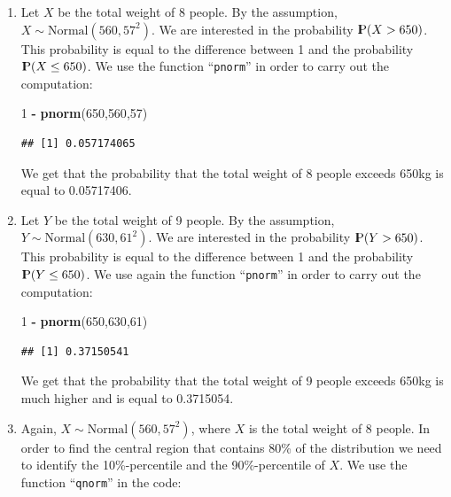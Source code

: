 \documentclass[]{krantz}
\makeatletter
\newenvironment{Shaded}{\begin{snugshade}}{\end{snugshade}}
\newcommand{\KeywordTok}[1]{\textcolor[rgb]{0.13,0.29,0.53}{\textbf{#1}}}
\newcommand{\DecValTok}[1]{\textcolor[rgb]{0.00,0.00,0.81}{#1}}
\newcommand{\StringTok}[1]{\textcolor[rgb]{0.31,0.60,0.02}{#1}}
\newcommand{\OperatorTok}[1]{\textcolor[rgb]{0.81,0.36,0.00}{\textbf{#1}}}
\newcommand{\NormalTok}[1]{#1}
\newcommand{\Prob}{{\rm I\kern-.3em P}}
\newenvironment{kframe}{%
\medskip{}
\setlength{\fboxsep}{.8em}
 \def\at@end@of@kframe{}%
 \ifinner\ifhmode%
  \def\at@end@of@kframe{\end{minipage}}%
  \begin{minipage}{\columnwidth}%
 \fi\fi%
 \def\FrameCommand##1{\hskip\@totalleftmargin \hskip-\fboxsep
 \colorbox{shadecolor}{##1}\hskip-\fboxsep
     \hskip-\linewidth \hskip-\@totalleftmargin \hskip\columnwidth}%
 \MakeFramed {\advance\hsize-\width
   \@totalleftmargin\z@ \linewidth\hsize
   \@setminipage}}%
 {\par\unskip\endMakeFramed%
 \at@end@of@kframe}
\renewenvironment{Shaded}{\begin{kframe}}{\end{kframe}}
\theoremstyle{definition}
\theoremstyle{definition}
\theoremstyle{definition}
\theoremstyle{remark}
\makeatother
\begin{document}
\begin{enumerate}
\def\labelenumi{\arabic{enumi}.}
\item
  Let \(X\) be the total weight of 8 people. By the assumption,
  \(X \sim \mbox{Normal}(560, 57^2)\). We are interested in the
  probability \(\Prob(X > 650)\). This probability is equal to the
  difference between 1 and the probability \(\Prob(X \leq 650)\). We use
  the function ``\texttt{pnorm}'' in order to carry out the computation:

\begin{Shaded}
\begin{Highlighting}[]
\DecValTok{1} \OperatorTok{-}\StringTok{ }\KeywordTok{pnorm}\NormalTok{(}\DecValTok{650}\NormalTok{,}\DecValTok{560}\NormalTok{,}\DecValTok{57}\NormalTok{)}
\end{Highlighting}
\end{Shaded}

\begin{verbatim}
## [1] 0.057174065
\end{verbatim}

  We get that the probability that the total weight of 8 people exceeds
  650kg is equal to 0.05717406.
\item
  Let \(Y\) be the total weight of 9 people. By the assumption,
  \(Y \sim \mbox{Normal}(630, 61^2)\). We are interested in the
  probability \(\Prob(Y > 650)\). This probability is equal to the
  difference between 1 and the probability \(\Prob(Y \leq 650)\). We use
  again the function ``\texttt{pnorm}'' in order to carry out the
  computation:

\begin{Shaded}
\begin{Highlighting}[]
\DecValTok{1} \OperatorTok{-}\StringTok{ }\KeywordTok{pnorm}\NormalTok{(}\DecValTok{650}\NormalTok{,}\DecValTok{630}\NormalTok{,}\DecValTok{61}\NormalTok{)}
\end{Highlighting}
\end{Shaded}

\begin{verbatim}
## [1] 0.37150541
\end{verbatim}

  We get that the probability that the total weight of 9 people exceeds
  650kg is much higher and is equal to 0.3715054.
\item
  Again, \(X \sim \mbox{Normal}(560, 57^2)\), where \(X\) is the total
  weight of 8 people. In order to find the central region that contains
  80\% of the distribution we need to identify the 10\%-percentile and
  the 90\%-percentile of \(X\). We use the function ``\texttt{qnorm}''
  in the code:


\end{enumerate}
\end{document}
